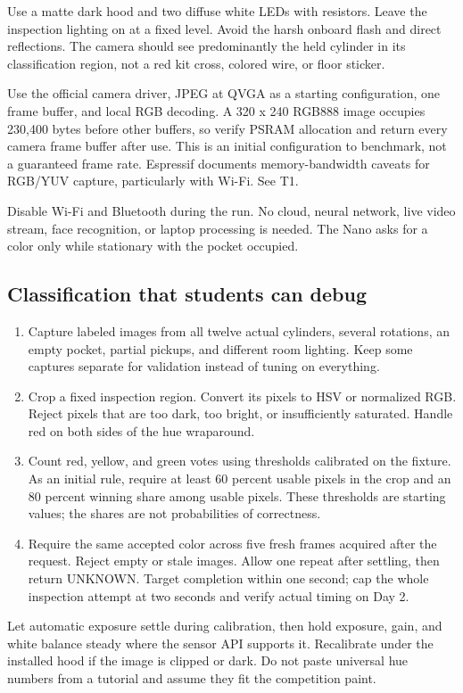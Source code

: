 \documentclass[10pt,a4paper]{article}
\begin{document}
Use a matte dark hood and two diffuse white LEDs with resistors. Leave the inspection lighting on at a fixed level. Avoid the harsh onboard flash and direct reflections. The camera should see predominantly the held cylinder in its classification region, not a red kit cross, colored wire, or floor sticker.

Use the official camera driver, JPEG at QVGA as a starting configuration, one frame buffer, and local RGB decoding. A 320 x 240 RGB888 image occupies 230,400 bytes before other buffers, so verify PSRAM allocation and return every camera frame buffer after use. This is an initial configuration to benchmark, not a guaranteed frame rate. Espressif documents memory-bandwidth caveats for RGB/YUV capture, particularly with Wi-Fi. See T1.

Disable Wi-Fi and Bluetooth during the run. No cloud, neural network, live video stream, face recognition, or laptop processing is needed. The Nano asks for a color only while stationary with the pocket occupied.

\subsection{Classification that students can debug}
\begin{enumerate}
\item Capture labeled images from all twelve actual cylinders, several rotations, an empty pocket, partial pickups, and different room lighting. Keep some captures separate for validation instead of tuning on everything.
\item Crop a fixed inspection region. Convert its pixels to HSV or normalized RGB. Reject pixels that are too dark, too bright, or insufficiently saturated. Handle red on both sides of the hue wraparound.
\item Count red, yellow, and green votes using thresholds calibrated on the fixture. As an initial rule, require at least 60 percent usable pixels in the crop and an 80 percent winning share among usable pixels. These thresholds are starting values; the shares are not probabilities of correctness.
\item Require the same accepted color across five fresh frames acquired after the request. Reject empty or stale images. Allow one repeat after settling, then return UNKNOWN. Target completion within one second; cap the whole inspection attempt at two seconds and verify actual timing on Day 2.
\end{enumerate}
Let automatic exposure settle during calibration, then hold exposure, gain, and white balance steady where the sensor API supports it. Recalibrate under the installed hood if the image is clipped or dark. Do not paste universal hue numbers from a tutorial and assume they fit the competition paint.
\end{document}
